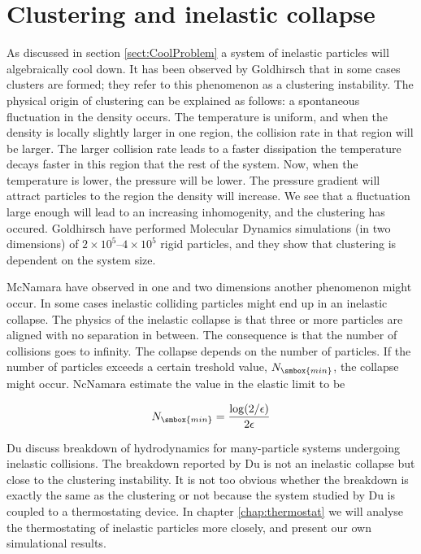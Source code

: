 \section{Clustering and inelastic collapse}
\label{InelasCollapse}
As discussed in section \ref{sect:CoolProblem} a system of inelastic
particles will algebraically cool down. It has been observed by \eg
Goldhirsch \etal \cite{Goldhirsch93} that in some cases clusters are
formed; they refer to this phenomenon as a clustering
instability. The physical origin of clustering can be explained as
follows: a spontaneous fluctuation in the density occurs. The temperature
is uniform, and when the density is locally slightly larger in one
region, the collision rate in that region will be larger. The
larger collision rate leads to a faster dissipation \ie the
temperature decays faster in this region that the rest of the
system. Now, when the temperature is lower, the pressure will be lower.
The pressure gradient will attract particles to the region \ie the
density will increase. We see that a fluctuation large enough will
lead to an increasing inhomogenity, and the clustering has
occured. Goldhirsch \etal \cite{Goldhirsch93} have performed Molecular
Dynamics simulations (in two dimensions) of $2\times 10^5$--$4\times
10^5$ rigid particles, and they show that clustering is dependent on
the system size.

McNamara \etal \cite{McNamara93a, McNamara94a} have observed in
one and two dimensions another phenomenon might occur. In some
cases inelastic colliding particles might end up in an inelastic
collapse. The physics of the inelastic collapse is that three or more
particles are aligned with no separation in between. The consequence is
that the number of collisions goes to infinity. The collapse depends
on the number of particles. If the number of particles exceeds a
certain treshold value, $N_{\smbox{min}}$, the collapse might
occur. NcNamara \etal estimate the value in the elastic limit to be

\begin{equation}
  N_{\smbox{min}} = \frac{\log(2/\epsilon)}{2\epsilon}
\end{equation}

Du \etal \cite{Du95} discuss breakdown of hydrodynamics for
many-particle systems undergoing inelastic collisions. The breakdown
reported by Du \etal is not an inelastic collapse but close to the
clustering instability. It is not too obvious whether the breakdown is
exactly the same as the clustering or not because the system studied
by Du \etal is coupled to a thermostating device. In chapter
\ref{chap:thermostat} we will analyse the thermostating of inelastic
particles more closely, and present our own simulational results.

